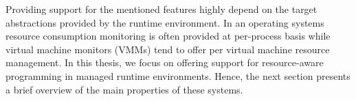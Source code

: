 Providing support for the mentioned features highly depend on the target abstractions provided by the runtime environment.
In an operating systems resource consumption monitoring is often provided at per-process basis while
virtual machine monitors (VMMs) tend to offer per virtual machine resource management.
In this thesis, we focus on offering support for resource-aware programming in managed runtime environments.
Hence, the next section presents a brief overview of the main properties of these systems. 

\begin{comment}

Debe resaltarse en un parrafo inicial como todo lo que hace una computadora esta en definitiva asociado con recursos.

Esta seccion describe y define lo que entendemos por resource aware programming. Esto no es muy sencillo puesto que no hay una definion muy formal que digamos.

De hecho, este es un termino al que se hace referencia en varios lugares para referirse a la capacidad de ciertos sistemas de software para adaptar su funconamiento en base ala existencia de recursos.

Es valido destacar en este punto,  la relacion que tiene esto con los sistemas adaptables y reconfigutrables y en defintiva con el concepto general de MAPE Loop.

Ademas, se persiguen objetivos como los siguientes cuando se quiere ser resource aware:
\begin{itemize}
\item Mejorar eficiencia
\item Mejorar parametros de calidad de la aplicacion como availability
\item Asegurar resource isolation para critical applications
\item Garantizar cuotas de uso para distintios usuarios
\end{itemize}

Como lo vemos, hay tres cualidades que pueden pedirse cuando se quiere ser resource aware:
\begin{itemize}
\item Resource consumption monitoring
\item Resource reservation
\item Observing resource availability (overcommitment) 
\end{itemize}




Un punto escencial aqui es establecer bien claro cual es la diferencia entre:
\begin{itemize}
\item resource awareness vs real-time
\item resource reservation vs scheduling
\end{itemize}


\end{comment}
